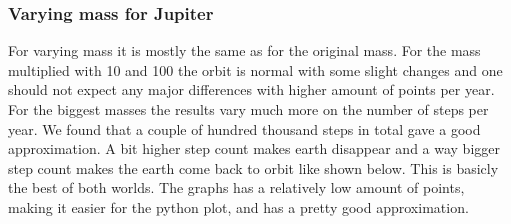 \subsubsection{Varying mass for Jupiter}

For varying mass it is mostly the same as for the original mass. For the mass multiplied with 10 and 100 the orbit is normal with some slight changes and one should not expect any major differences with higher amount of points per year. For the biggest masses the results vary much more on the number of steps per year. We found that a couple of hundred thousand steps in total gave a good approximation. A bit higher step count makes earth disappear and a way bigger step count makes the earth come back to orbit like shown below. This is basicly the best of both worlds. The graphs has a relatively low amount of points, making it easier for the python plot, and has a pretty good approximation.

